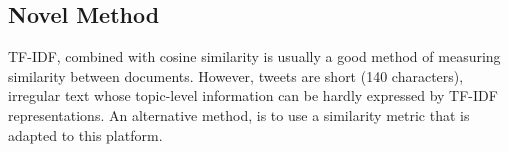 \documentclass[letterpaper]{article}
\begin{document}





\subsection{Novel Method}
TF-IDF, combined with cosine similarity is usually a good method of measuring similarity between documents. However, tweets are short (140 characters), irregular text whose topic-level information can be hardly expressed by TF-IDF representations. An alternative method, is to use a similarity metric that is adapted to this platform.
\end{document}
